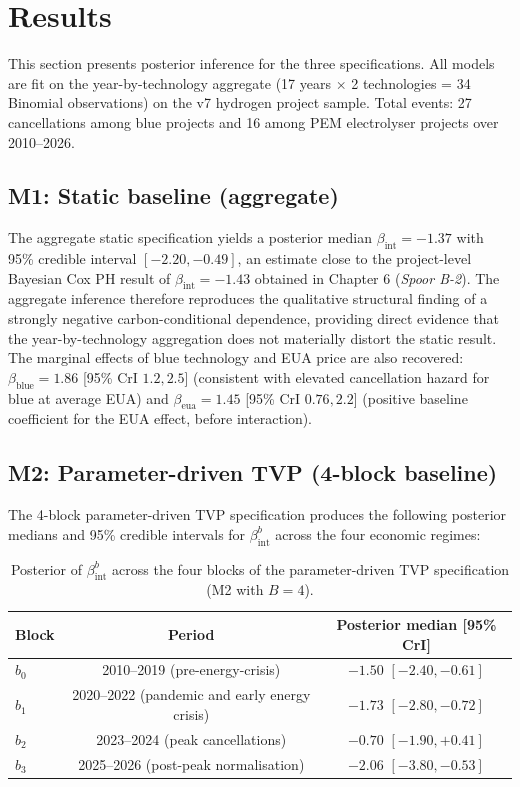 \documentclass[11pt,a4paper]{article}
\newcommand{\bint}{\beta_{\mathrm{int}}}
\newcommand{\bblue}{\beta_{\mathrm{blue}}}
\newcommand{\beua}{\beta_{\mathrm{eua}}}
\begin{document}
\section{Results}
\label{sec:ch7-results}

This section presents posterior inference for the three specifications. All models are fit on the year-by-technology aggregate (17 years $\times$ 2 technologies = 34 Binomial observations) on the v7 hydrogen project sample. Total events: 27 cancellations among blue projects and 16 among PEM electrolyser projects over 2010--2026.

\subsection{M1: Static baseline (aggregate)}
\label{sec:ch7-m1}

The aggregate static specification yields a posterior median $\bint = -1.37$ with 95\% credible interval $[-2.20, -0.49]$, an estimate close to the project-level Bayesian Cox PH result of $\bint = -1.43$ obtained in Chapter 6 (\textit{Spoor B-2}). The aggregate inference therefore reproduces the qualitative structural finding of a strongly negative carbon-conditional dependence, providing direct evidence that the year-by-technology aggregation does not materially distort the static result. The marginal effects of blue technology and EUA price are also recovered: $\bblue = 1.86$ [95\% CrI $1.2, 2.5$] (consistent with elevated cancellation hazard for blue at average EUA) and $\beua = 1.45$ [95\% CrI $0.76, 2.2$] (positive baseline coefficient for the EUA effect, before interaction).

\subsection{M2: Parameter-driven TVP (4-block baseline)}
\label{sec:ch7-m2}

The 4-block parameter-driven TVP specification produces the following posterior medians and 95\% credible intervals for $\bint^{b}$ across the four economic regimes:

\begin{table}[h!]
\centering
\caption{Posterior of $\bint^{b}$ across the four blocks of the parameter-driven TVP specification (M2 with $B=4$).}
\begin{tabular}{lcc}
\toprule
Block & Period & Posterior median [95\% CrI] \\
\midrule
$b_0$ & 2010--2019 (pre-energy-crisis) & $-1.50$ $[-2.40, -0.61]$ \\
$b_1$ & 2020--2022 (pandemic and early energy crisis) & $-1.73$ $[-2.80, -0.72]$ \\
$b_2$ & 2023--2024 (peak cancellations) & $-0.70$ $[-1.90, +0.41]$ \\
$b_3$ & 2025--2026 (post-peak normalisation) & $-2.06$ $[-3.80, -0.53]$ \\
\bottomrule
\end{tabular}
\label{tab:ch7-blocks}
\end{table}
\end{document}
